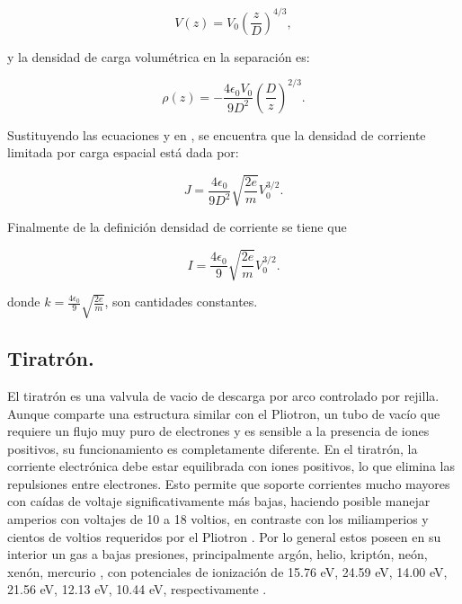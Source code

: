 \begin{equation}
	\label{eq:vz}
	V(z) = V_0 \left( \frac{z}{D} \right)^{4/3},
\end{equation}

y la densidad de carga volumétrica en la separación es:

\begin{equation}
	\label{eq:rho}
	\rho(z) = -\frac{4 \epsilon_0 V_0}{9 D^2} \left( \frac{D}{z} \right)^{2/3}.
\end{equation}

Sustituyendo las ecuaciones \ut{\ref{eq:vz}} y \ut{\ref{eq:rho}} en \ut{\ref{eq:otrarho}}, se encuentra que la densidad de corriente limitada por carga espacial está dada por:

\begin{equation}
	J = \frac{4 \epsilon_0}{9 D^2} \sqrt{\frac{2e}{m}} V_0^{3/2}.
\end{equation}

Finalmente de la definición densidad de corriente se tiene que 

\begin{equation}
	I =  \frac{4 \epsilon_0}{9} \sqrt{\frac{2e}{m}} V_0^{3/2}.
\end{equation}

donde $k = \frac{4 \epsilon_0}{9} \sqrt{\frac{2e}{m}}$, son cantidades constantes.

\subsection{Tiratrón.}

El tiratrón es una valvula de vacio de descarga por arco controlado por rejilla. Aunque comparte una estructura similar con el Pliotron, un tubo de vacío que requiere un flujo muy puro de electrones y es sensible a la presencia de iones positivos, su funcionamiento es completamente diferente. En el tiratrón, la corriente electrónica debe estar equilibrada con iones positivos, lo que elimina las repulsiones entre electrones. Esto permite que soporte corrientes mucho mayores con caídas de voltaje significativamente más bajas, haciendo posible manejar amperios con voltajes de 10 a 18 voltios, en contraste con los miliamperios y cientos de voltios requeridos por el Pliotron \cite{franklin}. Por lo general estos poseen en su interior un gas a bajas presiones, principalmente argón, helio, kriptón, neón, xenón, mercurio \cite{rhoet}, con potenciales de ionización de 15.76 eV, 24.59 eV, 14.00 eV, 21.56 eV, 12.13 eV, 10.44 eV, respectivamente \cite{lide}.

